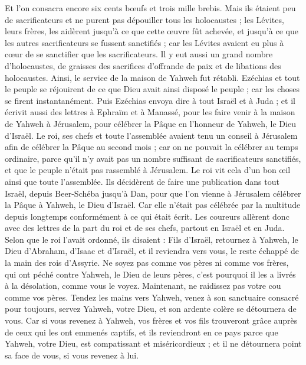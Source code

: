 \begin{multicols}{2}
Et l'on consacra encore six cents bœufs et trois mille brebis.
Mais ils étaient peu de sacrificateurs et ne purent pas dépouiller tous les holocaustes ; les Lévites, leurs frères, les aidèrent jusqu'à ce que cette œuvre fût achevée, et jusqu'à ce que les autres sacrificateurs se fussent sanctifiés ; car les Lévites avaient eu plus à cœur de se sanctifier que les sacrificateurs.
Il y eut aussi un grand nombre d'holocaustes, de graisses des sacrifices d’offrande de paix et de libations des holocaustes. Ainsi, le service de la maison de Yahweh fut rétabli.
Ezéchias et tout le peuple se réjouirent de ce que Dieu avait ainsi disposé le peuple ; car les choses se firent instantanément.
\VerseOne{}Puis Ezéchias envoya dire à tout Israël et à Juda ; et il écrivit aussi des lettres à Ephraïm et à Manassé, pour les faire venir à la maison de Yahweh à Jérusalem, pour célébrer la Pâque en l'honneur de Yahweh, le Dieu d'Israël.
Le roi, ses chefs et toute l'assemblée avaient tenu un conseil à Jérusalem afin de célébrer la Pâque au second mois ;
car on ne pouvait la célébrer au temps ordinaire, parce qu'il n'y avait pas un nombre suffisant de sacrificateurs sanctifiés, et que le peuple n'était pas rassemblé à Jérusalem.
Le roi vit cela d’un bon œil ainsi que toute l'assemblée.
Ils décidèrent de faire une publication dans tout Israël, depuis Beer-Schéba jusqu'à Dan, pour que l'on vienne à Jérusalem célébrer la Pâque à Yahweh, le Dieu d'Israël. Car elle n’était pas célébrée par la multitude depuis longtemps conformément à ce qui était écrit.
Les coureurs allèrent donc avec des lettres de la part du roi et de ses chefs, partout en Israël et en Juda. Selon que le roi l'avait ordonné, ils disaient : Fils d’Israël, retournez à Yahweh, le Dieu d'Abraham, d'Isaac et d'Israël, et il reviendra vers vous, le reste échappé de la main des rois d'Assyrie.
Ne soyez pas comme vos pères ni comme vos frères, qui ont péché contre Yahweh, le Dieu de leurs pères, c'est pourquoi il les a livrés à la désolation, comme vous le voyez.
Maintenant, ne raidissez pas votre cou comme vos pères. Tendez les mains vers Yahweh, venez à son sanctuaire consacré pour toujours, servez Yahweh, votre Dieu, et son ardente colère se détournera de vous.
Car si vous revenez à Yahweh, vos frères et vos fils trouveront grâce auprès de ceux qui les ont emmenés captifs, et ils reviendront en ce pays parce que Yahweh, votre Dieu, est compatissant et miséricordieux ; et il ne détournera point sa face de vous, si vous revenez à lui.

\end{multicols}
